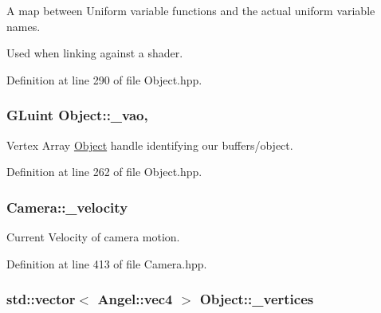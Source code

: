 A map between Uniform variable functions and the actual uniform variable names. 

Used when linking against a shader. 

Definition at line 290 of file Object.\-hpp.

\hypertarget{class_object_a564aa6b1df66a05ab6b6c2f071851c4e}{
\subsubsection[{\-\_\-vao}]{\setlength{\rightskip}{0pt plus 5cm}G\-Luint Object\-::\-\_\-vao\hspace{0.3cm}{\ttfamily [protected]}, {\ttfamily [inherited]}}}\label{class_object_a564aa6b1df66a05ab6b6c2f071851c4e}


Vertex Array \hyperlink{class_object}{Object} handle identifying our buffers/object. 



Definition at line 262 of file Object.\-hpp.

\hypertarget{class_camera_aa15577ff9e67c81699ee86d4d20a7ee7}{
\subsubsection[{\-\_\-velocity}]{ Camera\-::\-\_\-velocity\hspace{0.3cm}{\ttfamily [private]}}}\label{class_camera_aa15577ff9e67c81699ee86d4d20a7ee7}


Current Velocity of camera motion. 



Definition at line 413 of file Camera.\-hpp.

\hypertarget{class_object_a4ac354b3ec284f27358b1d4b8d95b9a9}{
\subsubsection[{\-\_\-vertices}]{\setlength{\rightskip}{0pt plus 5cm}std\-::vector$<$ {\bf Angel\-::vec4} $>$ Object\-::\-\_\-vertices\hspace{0.3cm}{\ttfamily [inherited]}}}\label{class_object_a4ac354b3ec284f27358b1d4b8d95b9a9}


